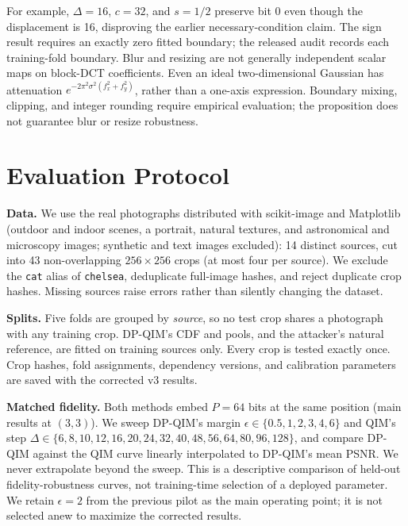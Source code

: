 \documentclass[conference,10pt]{IEEEtran}
\begin{document}
For example, $\Delta=16$, $c=32$, and $s=1/2$ preserve bit 0 even though
the displacement is 16, disproving the earlier necessary-condition claim.
The sign result requires an exactly zero fitted boundary; the released audit
records each training-fold boundary. Blur and resizing are not generally
independent scalar maps on block-DCT coefficients. Even an ideal two-dimensional
Gaussian has attenuation $e^{-2\pi^2\sigma^2(f_x^2+f_y^2)}$, rather than a
one-axis expression. Boundary mixing, clipping, and integer rounding require
empirical evaluation; the proposition does not guarantee blur or resize robustness.

\section{Evaluation Protocol}
\label{sec:protocol}

\textbf{Data.} We use the real photographs distributed with scikit-image and
Matplotlib (outdoor and indoor scenes, a portrait, natural textures, and
astronomical and microscopy images; synthetic and text images excluded): 14
distinct sources, cut into 43 non-overlapping $256{\times}256$ crops (at most
four per source). We exclude the \texttt{cat} alias of \texttt{chelsea},
deduplicate full-image hashes, and reject duplicate crop hashes. Missing sources
raise errors rather than silently changing the dataset.

\textbf{Splits.} Five folds are grouped by \emph{source}, so no test crop
shares a photograph with any training crop. DP-QIM's CDF and pools, and the
attacker's natural reference, are fitted on training sources only. Every crop
is tested exactly once. Crop hashes, fold assignments, dependency versions,
and calibration parameters are saved with the corrected v3 results.

\textbf{Matched fidelity.} Both methods embed $P{=}64$ bits at the same
position (main results at $(3,3)$). We sweep DP-QIM's margin
$\epsilon\in\{0.5,1,2,3,4,6\}$ and QIM's step
$\Delta\in\{6,8,10,12,16,20,24,32,40,48,56,64,80,96,128\}$, and compare
DP-QIM against the QIM curve linearly interpolated to DP-QIM's mean PSNR. We
never extrapolate beyond the sweep. This is a descriptive comparison of held-out
fidelity-robustness curves, not training-time selection of a deployed parameter.
We retain $\epsilon=2$ from the previous pilot as the main operating point;
it is not selected anew to maximize the corrected results.
\end{document}
